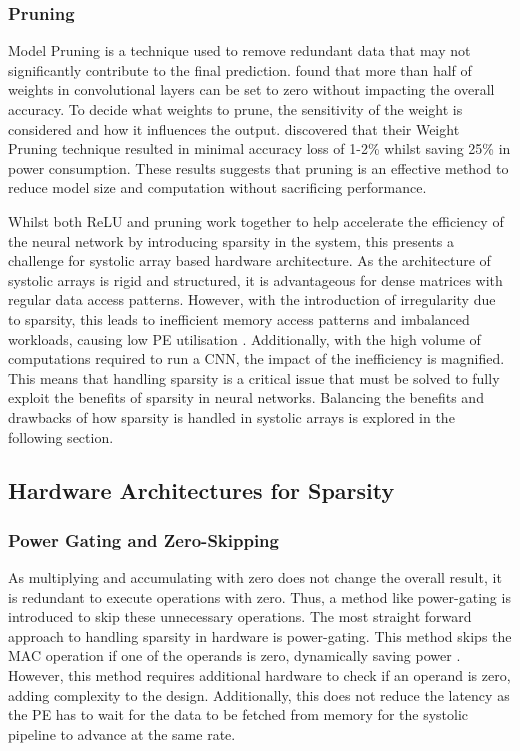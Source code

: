\documentclass[12pt, a4paper, ukenglish]{article}
\begin{document}
    
        \subsubsection{Pruning} 

    Model Pruning is a technique used to remove redundant data that may not significantly contribute to the final prediction. \textcite{kim_fpga_2021} found that more than half of weights in convolutional layers can be set to zero without impacting the overall accuracy. To decide what weights to prune, the sensitivity of the weight is considered and how it influences the output. \textcite{gorvadiya_energy_2025} discovered that their Weight Pruning technique resulted in minimal accuracy loss of 1-2\% whilst saving 25\% in power consumption. These results suggests that pruning is an effective method to reduce model size and computation without sacrificing performance.

    Whilst both ReLU and pruning work together to help accelerate the efficiency of the neural network by introducing sparsity in the system, this presents a challenge for systolic array based hardware architecture.
    As the architecture of systolic arrays is rigid and structured, it is advantageous for dense matrices with regular data access patterns. However, with the introduction of irregularity due to sparsity, this leads to inefficient memory access patterns and imbalanced workloads, causing low PE utilisation \cite{he_sparse-tpu_2020}. Additionally, with the high volume of computations required to run a CNN, the impact of the inefficiency is magnified. This means that handling sparsity is a critical issue that must be solved to fully exploit the benefits of sparsity in neural networks. Balancing the benefits and drawbacks of how sparsity is handled in systolic arrays is explored in the following section.

    \subsection{Hardware Architectures for Sparsity} \label{sec: hardware arch spars}
        \subsubsection{Power Gating and Zero-Skipping} \label{sec: power-gating}
        As multiplying and accumulating with zero does not change the overall result, it is redundant to execute operations with zero. Thus, a method like power-gating is introduced to skip these unnecessary operations. The most straight forward approach to handling sparsity in hardware is power-gating. This method skips the MAC operation if one of the operands is zero, dynamically saving power \cite{parashar_scnn_2017}. However, this method requires additional hardware to check if an operand is zero, adding complexity to the design. Additionally, this does not reduce the latency as the PE has to wait for the data to be fetched from memory for the systolic pipeline to advance at the same rate.
        
\end{document}

